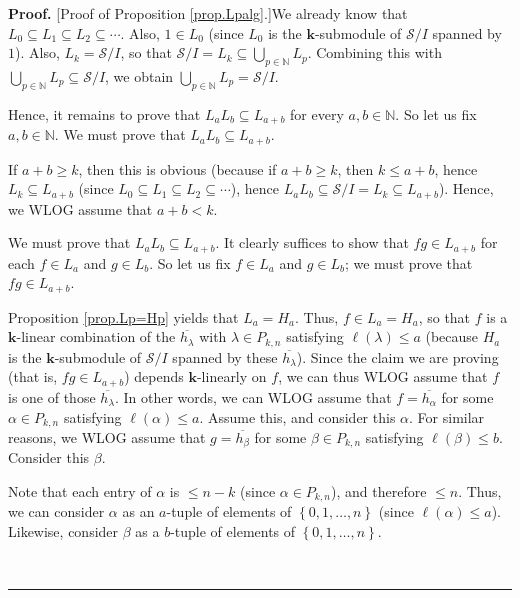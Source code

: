 \documentclass[numbers=enddot,12pt,final,onecolumn,notitlepage]{scrartcl}%
\theoremstyle{definition}
\newenvironment{proof}[1][Proof]{\noindent\textbf{#1.} }{\ \rule{0.5em}{0.5em}}
\begin{document}
\begin{proof}
[Proof of Proposition \ref{prop.Lpalg}.]We already know that $L_{0}\subseteq
L_{1}\subseteq L_{2}\subseteq\cdots$. Also, $1\in L_{0}$ (since $L_{0}$ is the
$\mathbf{k}$-submodule of $\mathcal{S}/I$ spanned by $1$). Also,
$L_{k}=\mathcal{S}/I$, so that $\mathcal{S}/I=L_{k}\subseteq\bigcup
_{p\in\mathbb{N}}L_{p}$. Combining this with $\bigcup_{p\in\mathbb{N}}%
L_{p}\subseteq\mathcal{S}/I$, we obtain $\bigcup_{p\in\mathbb{N}}%
L_{p}=\mathcal{S}/I$.

Hence, it remains to prove that $L_{a}L_{b}\subseteq L_{a+b}$ for every
$a,b\in\mathbb{N}$. So let us fix $a,b\in\mathbb{N}$. We must prove that
$L_{a}L_{b}\subseteq L_{a+b}$.

If $a+b\geq k$, then this is obvious (because if $a+b\geq k$, then $k\leq
a+b$, hence $L_{k}\subseteq L_{a+b}$ (since $L_{0}\subseteq L_{1}\subseteq
L_{2}\subseteq\cdots$), hence $L_{a}L_{b}\subseteq\mathcal{S}/I=L_{k}\subseteq
L_{a+b}$). Hence, we WLOG assume that $a+b<k$.

We must prove that $L_{a}L_{b}\subseteq L_{a+b}$. It clearly suffices to show
that $fg\in L_{a+b}$ for each $f\in L_{a}$ and $g\in L_{b}$. So let us fix
$f\in L_{a}$ and $g\in L_{b}$; we must prove that $fg\in L_{a+b}$.

Proposition \ref{prop.Lp=Hp} yields that $L_{a}=H_{a}$. Thus, $f\in
L_{a}=H_{a}$, so that $f$ is a $\mathbf{k}$-linear combination of the
$\overline{h_{\lambda}}$ with $\lambda\in P_{k,n}$ satisfying $\ell\left(
\lambda\right)  \leq a$ (because $H_{a}$ is the $\mathbf{k}$-submodule of
$\mathcal{S}/I$ spanned by these $\overline{h_{\lambda}}$). Since the claim we
are proving (that is, $fg\in L_{a+b}$) depends $\mathbf{k}$-linearly on $f$,
we can thus WLOG assume that $f$ is one of those $\overline{h_{\lambda}}$. In
other words, we can WLOG assume that $f=\overline{h_{\alpha}}$ for some
$\alpha\in P_{k,n}$ satisfying $\ell\left(  \alpha\right)  \leq a$. Assume
this, and consider this $\alpha$. For similar reasons, we WLOG assume that
$g=\overline{h_{\beta}}$ for some $\beta\in P_{k,n}$ satisfying $\ell\left(
\beta\right)  \leq b$. Consider this $\beta$.

Note that each entry of $\alpha$ is $\leq n-k$ (since $\alpha\in P_{k,n}$),
and therefore $\leq n$. Thus, we can consider $\alpha$ as an $a$-tuple of
elements of $\left\{  0,1,\ldots,n\right\}  $ (since $\ell\left(
\alpha\right)  \leq a$). Likewise, consider $\beta$ as a $b$-tuple of elements
of $\left\{  0,1,\ldots,n\right\}  $.


\end{proof}
\end{document}
